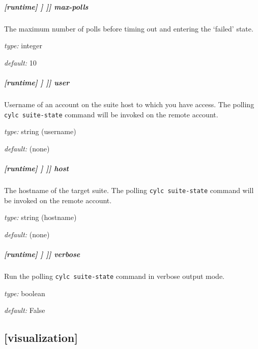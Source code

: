 \subparagraph[max-polls]{[runtime] \textrightarrow [[\_\_NAME\_\_]] \textrightarrow [[[suite state polling]]] \textrightarrow max-polls}

The maximum number of polls before timing out and entering the `failed' state.

\begin{myitemize}
    \item {\em type:} integer
    \item {\em default:} 10
\end{myitemize}

\subparagraph[user]{[runtime] \textrightarrow [[\_\_NAME\_\_]] \textrightarrow [[[suite state polling]]] \textrightarrow user}

Username of an account on the suite host to which you have access. The
polling \lstinline=cylc suite-state= command will be invoked
on the remote account.

\begin{myitemize}
    \item {\em type:} string (username)
    \item {\em default:} (none)
\end{myitemize}

\subparagraph[host]{[runtime] \textrightarrow [[\_\_NAME\_\_]] \textrightarrow [[[suite state polling]]] \textrightarrow host}

The hostname of the target suite. The polling \lstinline=cylc suite-state= command
will be invoked on the remote account.

\begin{myitemize}
    \item {\em type:} string (hostname)
    \item {\em default:} (none)
\end{myitemize}

\subparagraph[verbose]{[runtime] \textrightarrow [[\_\_NAME\_\_]] \textrightarrow [[[suite state polling]]] \textrightarrow verbose}

Run the polling \lstinline=cylc suite-state= command in verbose output mode.

\begin{myitemize}
    \item {\em type:} boolean
    \item {\em default:} False
\end{myitemize}

\subsection{[visualization]}

